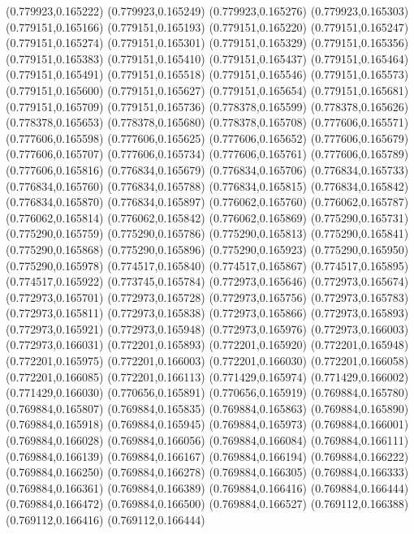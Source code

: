 (0.779923,0.165222)
(0.779923,0.165249)
(0.779923,0.165276)
(0.779923,0.165303)
(0.779151,0.165166)
(0.779151,0.165193)
(0.779151,0.165220)
(0.779151,0.165247)
(0.779151,0.165274)
(0.779151,0.165301)
(0.779151,0.165329)
(0.779151,0.165356)
(0.779151,0.165383)
(0.779151,0.165410)
(0.779151,0.165437)
(0.779151,0.165464)
(0.779151,0.165491)
(0.779151,0.165518)
(0.779151,0.165546)
(0.779151,0.165573)
(0.779151,0.165600)
(0.779151,0.165627)
(0.779151,0.165654)
(0.779151,0.165681)
(0.779151,0.165709)
(0.779151,0.165736)
(0.778378,0.165599)
(0.778378,0.165626)
(0.778378,0.165653)
(0.778378,0.165680)
(0.778378,0.165708)
(0.777606,0.165571)
(0.777606,0.165598)
(0.777606,0.165625)
(0.777606,0.165652)
(0.777606,0.165679)
(0.777606,0.165707)
(0.777606,0.165734)
(0.777606,0.165761)
(0.777606,0.165789)
(0.777606,0.165816)
(0.776834,0.165679)
(0.776834,0.165706)
(0.776834,0.165733)
(0.776834,0.165760)
(0.776834,0.165788)
(0.776834,0.165815)
(0.776834,0.165842)
(0.776834,0.165870)
(0.776834,0.165897)
(0.776062,0.165760)
(0.776062,0.165787)
(0.776062,0.165814)
(0.776062,0.165842)
(0.776062,0.165869)
(0.775290,0.165731)
(0.775290,0.165759)
(0.775290,0.165786)
(0.775290,0.165813)
(0.775290,0.165841)
(0.775290,0.165868)
(0.775290,0.165896)
(0.775290,0.165923)
(0.775290,0.165950)
(0.775290,0.165978)
(0.774517,0.165840)
(0.774517,0.165867)
(0.774517,0.165895)
(0.774517,0.165922)
(0.773745,0.165784)
(0.772973,0.165646)
(0.772973,0.165674)
(0.772973,0.165701)
(0.772973,0.165728)
(0.772973,0.165756)
(0.772973,0.165783)
(0.772973,0.165811)
(0.772973,0.165838)
(0.772973,0.165866)
(0.772973,0.165893)
(0.772973,0.165921)
(0.772973,0.165948)
(0.772973,0.165976)
(0.772973,0.166003)
(0.772973,0.166031)
(0.772201,0.165893)
(0.772201,0.165920)
(0.772201,0.165948)
(0.772201,0.165975)
(0.772201,0.166003)
(0.772201,0.166030)
(0.772201,0.166058)
(0.772201,0.166085)
(0.772201,0.166113)
(0.771429,0.165974)
(0.771429,0.166002)
(0.771429,0.166030)
(0.770656,0.165891)
(0.770656,0.165919)
(0.769884,0.165780)
(0.769884,0.165807)
(0.769884,0.165835)
(0.769884,0.165863)
(0.769884,0.165890)
(0.769884,0.165918)
(0.769884,0.165945)
(0.769884,0.165973)
(0.769884,0.166001)
(0.769884,0.166028)
(0.769884,0.166056)
(0.769884,0.166084)
(0.769884,0.166111)
(0.769884,0.166139)
(0.769884,0.166167)
(0.769884,0.166194)
(0.769884,0.166222)
(0.769884,0.166250)
(0.769884,0.166278)
(0.769884,0.166305)
(0.769884,0.166333)
(0.769884,0.166361)
(0.769884,0.166389)
(0.769884,0.166416)
(0.769884,0.166444)
(0.769884,0.166472)
(0.769884,0.166500)
(0.769884,0.166527)
(0.769112,0.166388)
(0.769112,0.166416)
(0.769112,0.166444)
